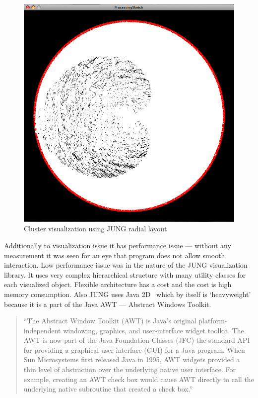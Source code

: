 \begin{figure}[h!]
\centering
\includegraphics[scale=0.4]{pictures/using_JUNG_radial.png}
\caption{Cluster visualization using JUNG radial layout}
\label{fig:JUNG_radial_layout}
\end{figure}


Additionally to visualization issue it has performance issue ---
without any measurement it was seen for an eye that program does not allow smooth interaction.
Low performance issue was in the nature of the JUNG visualization library.
It uses very complex hierarchical structure with many utility classes for each visualized object.
Flexible architecture has a cost and the cost is high memory consumption.
Also JUNG uses Java 2D~\cite{JAVA_2D} which by itself is `heavyweight' because it is a part of the Java AWT --- Abstract Windows Toolkit.

\begin{quotation}
``The Abstract Window Toolkit (AWT) is Java's original platform-independent windowing, graphics, and user-interface widget toolkit.
The AWT is now part of the Java Foundation Classes (JFC) the standard API for providing a graphical user interface (GUI) for a Java program.
When Sun Microsystems first released Java in 1995, AWT widgets provided a thin level of abstraction over the underlying native user interface.
For example, creating an AWT check box would cause AWT directly to call the underlying native subroutine that created a check box.''~\cite{JAVA_AWT}
\end{quotation}

